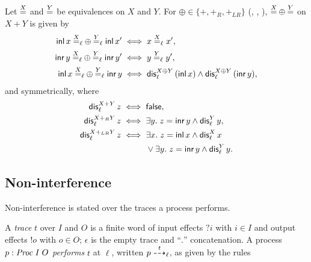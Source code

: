 \begin{definition}[Sums]\label{def:sum}
Let $\overset{X}{=}$ and $\overset{Y}{=}$ be equivalences on $X$ and $Y$. For
${\oplus} \in \{{+}, {+_R}, {+_{LR}}\}$ (, , ),
${\overset{X}{=}} \oplus {\overset{Y}{=}}$ on $X + Y$ is given by
\begin{align*}
\mathsf{inl}\,x \mathrel{{\overset{X}{=}}_\ell \oplus {\overset{Y}{=}}_\ell} \mathsf{inl}\,x' &\iff x \overset{X}{=}_\ell x', \\
\mathsf{inr}\,y \mathrel{{\overset{X}{=}}_\ell \oplus {\overset{Y}{=}}_\ell} \mathsf{inr}\,y' &\iff y \overset{Y}{=}_\ell y', \\
\mathsf{inl}\,x \mathrel{{\overset{X}{=}}_\ell \oplus {\overset{Y}{=}}_\ell} \mathsf{inr}\,y &\iff
  \mathsf{dis}^{X \oplus Y}_\ell\,(\mathsf{inl}\,x) \wedge \mathsf{dis}^{X \oplus Y}_\ell\,(\mathsf{inr}\,y),
\end{align*}
and symmetrically, where
\begin{align*}
\dis^{X + Y}_\ell\,z &\iff \mathsf{false}, \\
\dis^{X +_R Y}_\ell\,z &\iff \exists y.\; z = \mathsf{inr}\,y \wedge \dis^Y_\ell\,y, \\
\dis^{X +_{LR} Y}_\ell\,z &\iff \exists x.\; z = \mathsf{inl}\,x \wedge \dis^X_\ell\,x \\
&\phantom{{}\iff{}} \vee \exists y.\; z = \mathsf{inr}\,y \wedge \dis^Y_\ell\,y.
\end{align*}
\end{definition}

\subsection{Non-interference}

Non-interference is stated over the traces a process performs.

\begin{definition}\label{def:trace}
A \emph{trace} $t$ over $I$ and $O$ is a finite word of input effects $?i$ with
$i \in I$ and output effects $!o$ with $o \in O$; $\epsilon$ is the empty trace and
``$.$'' concatenation. A process $p : \mathit{Proc}\;I\;O$ \emph{performs} $t$ at $\ell$,
written $p \overset{t}{\dashrightarrow}_{\ell}$, as given by the rules
\end{definition}

